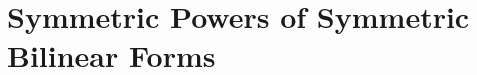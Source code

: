 \documentclass[11pt,twoside]{article}
\begin{document}








\newpage

\tableofcontents

\cleardoublepage


\pagestyle{fancy}




\newpage
\part{Symmetric Powers of Symmetric Bilinear Forms}

\newpage
\end{document}
